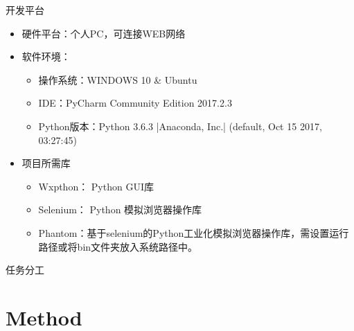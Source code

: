 \documentclass[aspectratio=169]{beamer}
\begin{document}
\begin{frame}{开发平台}
\begin{itemize}
  \item 硬件平台：个人PC，可连接WEB网络
  \item 软件环境：
  \begin{itemize}
    \item 操作系统：WINDOWS 10 \& Ubuntu
    \item IDE：PyCharm Community Edition 2017.2.3
    \item Python版本：Python 3.6.3 |Anaconda, Inc.| (default, Oct 15 2017, 03:27:45)
  \end{itemize}
  \item 项目所需库
  \begin{itemize}
    \item Wxpthon： Python GUI库
    \item Selenium： Python 模拟浏览器操作库
    \item Phantom：基于selenium的Python工业化模拟浏览器操作库，需设置运行路径或将bin文件夹放入系统路径中。
  \end{itemize}
\end{itemize}
\end{frame}

\begin{frame}{任务分工}
\begin{table}[!htbp]
  \centering
  \renewcommand\arraystretch{1.5}
 \end{table}
\end{frame}

\section{Method}
\end{document}
